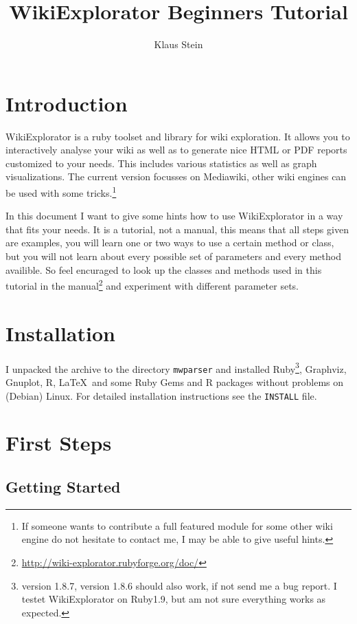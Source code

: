 \documentclass[a4paper]{scrartcl}
\title{WikiExplorator Beginners Tutorial}
\author{Klaus Stein}
\newcounter{tcounter}
\newcommand{\file}[1]{\texttt{\color{file}#1}}
\newcounter{fntrdoc}
\begin{document}
\maketitle
\clearpage
\tableofcontents
\clearpage

\section{Introduction}
\label{sec:intro}

WikiExplorator is a ruby toolset and library for wiki exploration. It
allows you to interactively analyse your wiki as well as to generate
nice HTML or PDF reports customized to your needs. This includes
various statistics as well as graph visualizations. The current version
focusses on Mediawiki, other wiki engines can be used with some
tricks.\footnote{If someone wants to contribute a full featured module
for some other wiki engine do not hesitate to contact me, I may be able to
give useful hints.}

In this document I want to give some hints how to use WikiExplorator
in a way that fits your needs. It is a tutorial, not a manual, this
means that all steps given are examples, you will learn one or two
ways to use a certain method or class, but you will not learn about
every possible set of parameters and every method availible. So feel
encuraged to look up the classes and methods used in this tutorial in the
manual\footnote{\url{http://wiki-explorator.rubyforge.org/doc/}}%
\setcounter{fntrdoc}{\thefootnote} and experiment with different
parameter sets.

\section{Installation}
\label{sec:install}

I unpacked the archive to the directory \file{mwparser} and installed
Ruby\footnote{version 1.8.7, version 1.8.6 should also work, if not
  send me a bug report. I testet WikiExplorator on Ruby1.9, but am not
  sure everything works as expected.}, Graphviz, Gnuplot, R, \LaTeX\ and
some Ruby Gems and R packages without problems on (Debian) Linux. For
detailed installation instructions see the \file{INSTALL} file. 

\section{First Steps}
\label{sec:first}

\subsection{Getting Started}
\label{sec:start}
\end{document}
